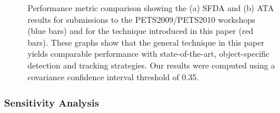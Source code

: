 \documentclass[twocolumn, final]{svjour3}
\begin{document}
\begin{figure}[!]
  \centering
  \hspace{1mm}
  \caption{Performance metric comparison showing the (a) SFDA and (b) ATA results for submissions to the PETS2009/PETS2010 workshops (blue bars) and for the technique introduced in this paper (red bars). These graphs show that the general technique in this paper yields comparable performance with state-of-the-art, object-specific detection and tracking strategies. Our results were computed using a covariance confidence interval threshold of 0.35.}
  \label{fig:sfda_and_ata_comparison}
\end{figure}




\subsubsection{Sensitivity Analysis}
\label{sec:sens_analysis}
\end{document}

